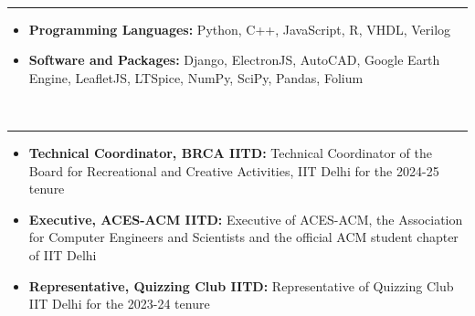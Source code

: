 \documentclass[9pt, letterpaper]{article}
\begin{document}





{
\noindent\fontsize{10}{12} \selectfont{SKILLS}
\\
\hrule \relax
}
\begin{itemize}[noitemsep]
    \item \textbf{Programming Languages:} Python, C++, JavaScript, R, VHDL, Verilog
    \item \textbf{Software and Packages:} Django, ElectronJS, AutoCAD, Google Earth Engine, LeafletJS, LTSpice,  NumPy, SciPy, Pandas, Folium
\end{itemize}


{
\noindent\fontsize{10}{12} \selectfont{RESPONSIBILITIES}
\\
\hrule \relax
}
\begin{itemize}[noitemsep] 
	\item \textbf{Technical Coordinator, BRCA IITD:} Technical Coordinator of the Board for Recreational and Creative Activities, IIT Delhi for the 2024-25 tenure
    \item \textbf{Executive, ACES-ACM IITD:} Executive of ACES-ACM, the Association for Computer Engineers and Scientists and the official ACM student chapter of IIT Delhi
    \item \textbf{Representative, Quizzing Club IITD:} Representative of Quizzing Club IIT Delhi for the 2023-24 tenure
\end{itemize}
\end{document}
